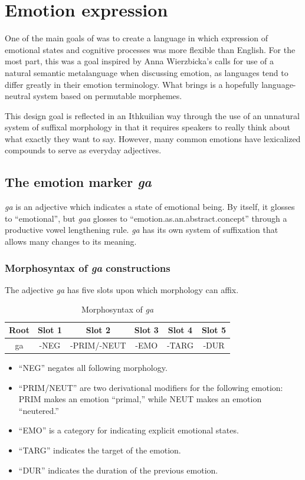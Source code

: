 \section{Emotion expression}
	One of the main goals of {\kurango} was to create a language in which expression of emotional states and cognitive processes was more flexible than English. For the most part, this was a goal inspired by Anna Wierzbicka's calls for use of a natural semantic metalanguage when discussing emotion, as languages tend to differ greatly in their emotion terminology. What {\kurango} brings is a hopefully language-neutral system based on permutable morphemes.

	This design goal is reflected in an Ithkuilian way through the use of an unnatural system of suffixal morphology in that it requires speakers to really think about what exactly they want to say. However, many common emotions have lexicalized compounds to serve as everyday adjectives.

	\subsection{The emotion marker \emph{ga}} %
		\emph{ga} is an adjective which indicates a state of emotional being. By itself, it glosses to ``emotional'', but \emph{gaa} glosses to ``emotion.as.an.abstract.concept'' through a productive vowel lengthening rule. \emph{ga} has its own system of suffixation that allows many changes to its meaning.

			\subsubsection{Morphosyntax of \emph{ga} constructions}
				The adjective \emph{ga} has five slots upon which morphology can affix.

					\begin{table}[H]
					\centering
					\label{ga_morphosyntax}
						\begin{tabular}{cccccc}
						Root & Slot 1 & Slot 2 & Slot 3 & Slot 4 & Slot 5 \\ \hline\hline
						ga & -NEG & -PRIM/-NEUT & -EMO & -TARG & -DUR \\ \hline
						\end{tabular}
						\caption{Morphosyntax of \emph{ga}}
					\end{table}

				\begin{itemize}
					\item ``NEG'' negates all following morphology.
					\item ``PRIM/NEUT'' are two derivational modifiers for the following emotion: PRIM makes an emotion ``primal,'' while NEUT makes an emotion ``neutered.''
					\item ``EMO'' is a category for indicating explicit emotional states.
					\item ``TARG'' indicates the target of the emotion.
					\item ``DUR'' indicates the duration of the previous emotion.
				\end{itemize}

